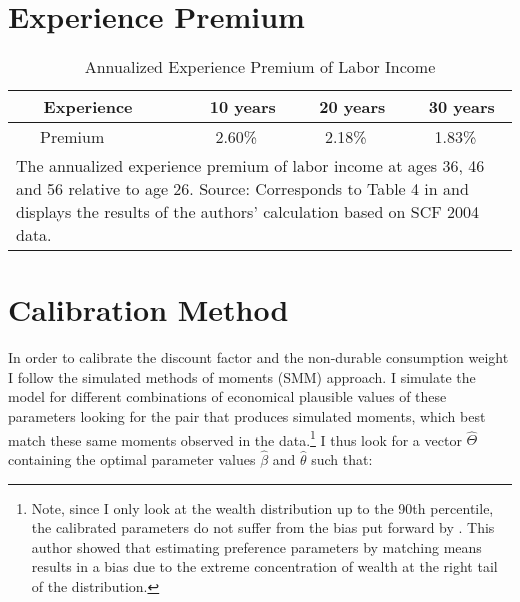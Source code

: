 \documentclass[a4paper,12pt,legno]{article}
\begin{document}
\newpage








\newpage{}
\appendix
\section{Experience Premium}
 \label{table_experience_premium}  


\begin{table}[!htbp]
\centering

\caption{Annualized Experience Premium of Labor Income}
\label{my-label}
\begin{tabular}{@{}llll@{}}
\toprule
 \ \ \ Experience \ \ & \ \ 10 years & \ \ 20 years & \ \ 30 years  \\ \midrule
  \ \ \ Premium \ \ & \ \ \ 2.60\%  & \ \ \ 2.18\%  & \ \ \ 1.83\% \\
\bottomrule
\multicolumn{4}{l}{%
  \begin{minipage}{9.5cm}%
\small The annualized experience premium of labor income at ages 36, 46 and 56 relative to age 26. Source: Corresponds to Table 4 in \cite{hintermaier2011} and displays the results of the authors' calculation based on SCF 2004 data.
  \end{minipage}%
}\\
\end{tabular}
\end{table}

\section{Calibration Method}
\label{estimation_procedure}
In order to calibrate the discount factor and the non-durable consumption weight I follow the simulated methods of moments (SMM) approach. I simulate the model for different combinations of economical plausible values of these parameters looking for the pair that produces simulated moments, which best match these same moments observed in the data.\footnote{Note, since I only look at the wealth distribution up to the 90th percentile, the calibrated parameters do not suffer from the bias put forward by \cite{cagetti2003}. This author showed that estimating preference parameters by matching means results in a bias due to the extreme concentration of wealth at the right tail of the distribution.} I thus look for a vector $\hat{\Theta}$ containing the optimal parameter values $\hat{\beta}$ and $\hat{\theta}$ such that: 
\end{document}
